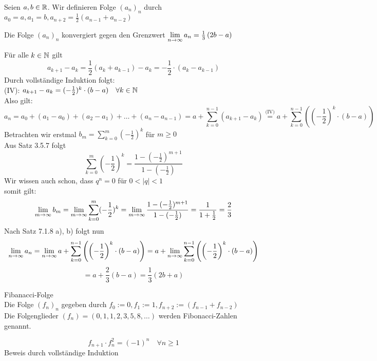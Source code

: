 \documentclass[../ana1u.tex]{subfiles}
\begin{document}
\begin{bsp} 
    Seien \(a, b \in \mathbb{R}\). Wir definieren Folge \((a_n)_n\) durch \(a_0 = a, a_1 = b, a_{n+2} = \frac{1}{2}\left(a_{n-1} + a_{n-2}\right)\)\\
    \begin{beh}
        Die Folge \((a_n)_n\) konvergiert gegen den Grenzwert \(\lim\limits_{n\rightarrow\infty} a_n = \frac{1}{3}\left(2b - a\right)\)
    \end{beh}
    \begin{bew}
        Für alle \(k \in \mathbb{N}\) gilt
        \[a_{k+1} - a_k = \frac{1}{2}\left(a_{k} + a_{k-1}\right) - a_k = -\frac{1}{2} \cdot (a_k - a_{k-1})\]
        Durch vollständige Induktion folgt:\\
        (IV): \(a_{k+1} - a_k =  (-\frac{1}{2})^k \cdot (b - a) \quad \forall k \in \mathbb{N}\)\\
        Also gilt:
        \[a_n = a_0 + (a_1 - a_0) + (a_2 - a_1) + \dots + (a_n - a_{n-1}) = a + \sum_{k=0}^{n-1}(a_{k+1} - a_k) \overset{\text{(IV)}}{=} a + \sum_{k=0}^{n-1} \left(\left(-\frac{1}{2}\right)^k \cdot (b - a)\right)\]
        Betrachten wir erstmal \(b_m = \sum_{k=0}^{m} (-\frac{1}{2})^k\) für \(m \geq 0\)\\
        Aus Satz 3.5.7 folgt
        \[\sum_{k=0}^{m} (-\frac{1}{2})^k = \frac{1-(-\frac{1}{2})^{m+1}}{1-(-\frac{1}{2})}\]
        Wir wissen auch schon, dass \(q^n = 0\) für \(0 < |q| < 1\)\\
        somit gilt:
        \[\lim\limits_{m\rightarrow\infty} b_m = \lim\limits_{m\rightarrow\infty} \sum_{k=0}^{m} (-\frac{1}{2})^k = \lim\limits_{m\rightarrow\infty} \frac{1-(-\frac{1}{2})^{m+1}}{1-(-\frac{1}{2})} = \frac{1}{1 + \frac{1}{2}} = \frac{2}{3}\]
        Nach Satz 7.1.8 a), b) folgt nun
        \[\lim\limits_{n\rightarrow\infty} a_n = \lim\limits_{n\rightarrow\infty} a + \sum_{k=0}^{n-1} \left(\left(-\frac{1}{2}\right)^k \cdot (b - a)\right) = a + \lim\limits_{n\rightarrow\infty} \sum_{k=0}^{n-1} \left(\left(-\frac{1}{2}\right)^k \cdot (b - a)\right)\]
        \[= a + \frac{2}{3}(b - a) = \frac{1}{3}(2b + a)\]
    \end{bew}
\end{bsp}
\begin{defi}
    Fibanacci-Folge\\
    Die Folge \((f_n)_n\) gegeben durch \(f_0 := 0, f_1 := 1, f_{n+2} := (f_{n-1} + f_{n-2})\)\\
    Die Folgenglieder \((f_n) = (0, 1, 1, 2, 3, 5, 8, \dots)\) werden Fibonacci-Zahlen genannt.
\end{defi}
\begin{beh}[1]
    \[f_{n+1} \cdot f_n^2 = (-1)^n \quad \forall n \geq 1\]
    Beweis durch vollständige Induktion
\end{beh}
\end{document}
